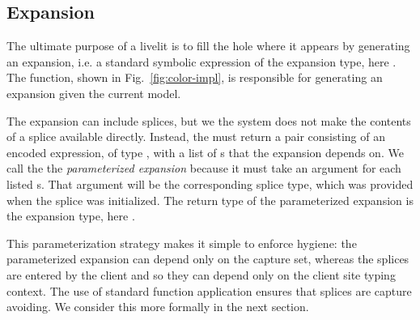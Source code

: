 \subsection{Expansion}
The ultimate purpose of a livelit is to fill the hole where it appears by generating an expansion,
i.e. a standard symbolic expression of the expansion type, here .
The  function, shown in Fig.~\ref{fig:color-impl}, is responsible for generating 
an expansion given the current model.

The expansion can include splices, but we the system does not make the contents of a splice 
available directly. Instead, the  must return a pair consisting of an encoded expression, of type 
, with a list of s that the expansion depends on. 
We call the  the \emph{parameterized expansion}
 because it must take an argument for each listed s. 
 That argument will be the corresponding splice 
type, which was provided when the splice was initialized. 
 The return type of the parameterized expansion is the expansion type, here .

This parameterization strategy makes it simple to enforce hygiene: the parameterized expansion 
can depend only on the capture set, whereas the splices are entered by the client and so they can 
depend only on the client site typing context. The use of standard function application ensures
that splices are capture avoiding. We consider this more formally in the next section.

